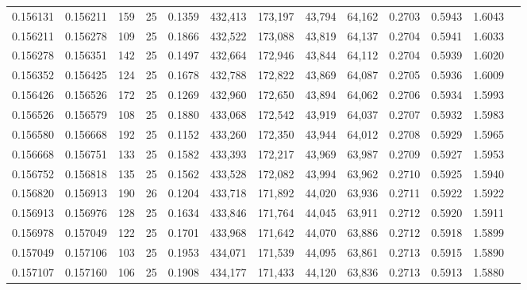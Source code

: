 \begin{tabular}{rrrrrrrrrrrrr}
0.156131 & 0.156211 &   159 &  25 &                                     0.1359 & 432,413 & 173,197 &  43,794 &  64,162 & 0.2703 & 0.5943 & 1.6043 \\
0.156211 & 0.156278 &   109 &  25 &                                     0.1866 & 432,522 & 173,088 &  43,819 &  64,137 & 0.2704 & 0.5941 & 1.6033 \\
0.156278 & 0.156351 &   142 &  25 &                                     0.1497 & 432,664 & 172,946 &  43,844 &  64,112 & 0.2704 & 0.5939 & 1.6020 \\
0.156352 & 0.156425 &   124 &  25 &                                     0.1678 & 432,788 & 172,822 &  43,869 &  64,087 & 0.2705 & 0.5936 & 1.6009 \\
0.156426 & 0.156526 &   172 &  25 &                                     0.1269 & 432,960 & 172,650 &  43,894 &  64,062 & 0.2706 & 0.5934 & 1.5993 \\
0.156526 & 0.156579 &   108 &  25 &                                     0.1880 & 433,068 & 172,542 &  43,919 &  64,037 & 0.2707 & 0.5932 & 1.5983 \\
0.156580 & 0.156668 &   192 &  25 &                                     0.1152 & 433,260 & 172,350 &  43,944 &  64,012 & 0.2708 & 0.5929 & 1.5965 \\
0.156668 & 0.156751 &   133 &  25 &                                     0.1582 & 433,393 & 172,217 &  43,969 &  63,987 & 0.2709 & 0.5927 & 1.5953 \\
0.156752 & 0.156818 &   135 &  25 &                                     0.1562 & 433,528 & 172,082 &  43,994 &  63,962 & 0.2710 & 0.5925 & 1.5940 \\
0.156820 & 0.156913 &   190 &  26 &                                     0.1204 & 433,718 & 171,892 &  44,020 &  63,936 & 0.2711 & 0.5922 & 1.5922 \\
0.156913 & 0.156976 &   128 &  25 &                                     0.1634 & 433,846 & 171,764 &  44,045 &  63,911 & 0.2712 & 0.5920 & 1.5911 \\
0.156978 & 0.157049 &   122 &  25 &                                     0.1701 & 433,968 & 171,642 &  44,070 &  63,886 & 0.2712 & 0.5918 & 1.5899 \\
0.157049 & 0.157106 &   103 &  25 &                                     0.1953 & 434,071 & 171,539 &  44,095 &  63,861 & 0.2713 & 0.5915 & 1.5890 \\
0.157107 & 0.157160 &   106 &  25 &                                     0.1908 & 434,177 & 171,433 &  44,120 &  63,836 & 0.2713 & 0.5913 & 1.5880 \\

\end{tabular}
